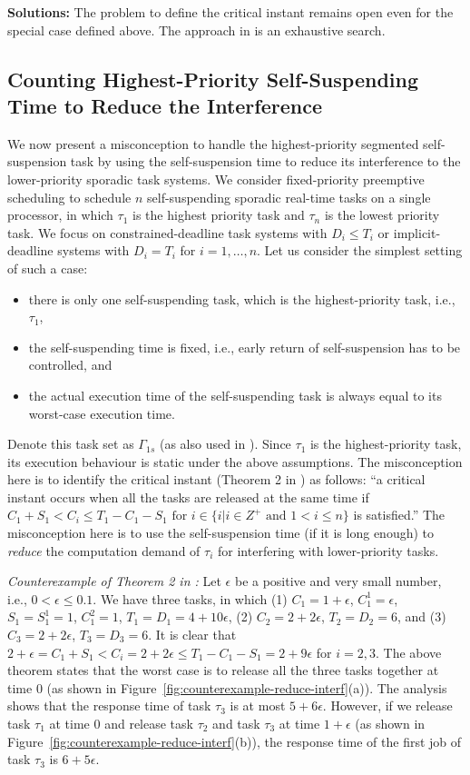 {\bf Solutions:} The problem to define the critical instant remains open even for the special case defined above. The approach in \cite{ecrts15nelissen} is an exhaustive search.

\subsection{Counting Highest-Priority Self-Suspending Time to Reduce the Interference}
\label{sec:wrong-highest-priority}

We now present a misconception to handle the highest-priority segmented self-suspension task by using the self-suspension time to reduce its interference to the lower-priority sporadic task systems. 
We consider fixed-priority preemptive scheduling to schedule $n$ self-suspending sporadic real-time tasks on a single processor, in which $\tau_1$ is the highest priority task and $\tau_n$ is the lowest priority task. We focus on constrained-deadline task systems with $D_i \leq T_i$ or implicit-deadline systems with $D_i=T_i$ for $i=1,\ldots,n$.
Let us consider the simplest setting of such a case:
\begin{itemize}
\item there is only one self-suspending task, which is the highest-priority task, i.e., $\tau_1$,
\item the self-suspending time is fixed, i.e., early return of self-suspension has to be controlled, and
\item the actual execution time of the self-suspending task is always equal to its worst-case execution time.
\end{itemize}
Denote this task set as $\Gamma_{1s}$ (as also used in \cite{RTSS-KimANR13}).  Since $\tau_1$ is the highest-priority task, its execution behaviour is static under the above assumptions. The misconception here is to identify the critical instant  (Theorem 2 in \cite{RTSS-KimANR13}) as follows: ``a critical instant occurs when all the tasks are released at the same time if $C_1 +S_1 < C_i  \leq T_1-C_1-S_1 \mbox{ for } i \in\{i|i\in Z^{+} \mbox{ and } 1<i\leq n\}$ is satisfied.'' The misconception here is to use the self-suspension time (if it is long enough) to \emph{reduce} the computation demand of $\tau_i$ for interfering with lower-priority tasks. 


{\it Counterexample of Theorem 2 in \cite{RTSS-KimANR13}:} Let $\epsilon$ be a positive and very small number, i.e., $0 < \epsilon \leq 0.1$. We have three tasks, in which
(1) $C_1= 1+ \epsilon$, $C_1^1 = \epsilon$, $S_1=S_1^1 = 1$, $C_1^2  = 1$, $T_{1} =D_1= 4 + 10 \epsilon$, (2) $C_2 = 2 + 2\epsilon$, $T_2 =D_2= 6$, and (3)
$C_3 = 2 + 2\epsilon$, $T_3 =D_3= 6$. It is clear that $2+\epsilon = C_1+S_1 < C_i = 2+2\epsilon \leq T_1-C_1-S_1 = 2+9\epsilon$ for $i=2,3$. The above theorem states that the worst case is to release all the three tasks together at time $0$ (as shown in Figure~\ref{fig:counterexample-reduce-interf}(a)). The analysis shows that the response time of task $\tau_3$ is at most $5+6\epsilon$. However, if we release task $\tau_1$ at time $0$ and release task $\tau_2$ and task $\tau_3$ at time $1+\epsilon$ (as shown in Figure~\ref{fig:counterexample-reduce-interf}(b)), the response time of the first job of task $\tau_3$ is $6+5\epsilon$. 

